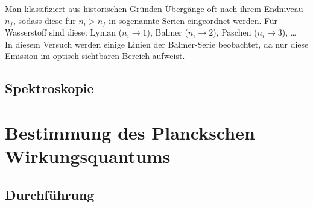 \documentclass[11pt, a4paper]{article}
\numberwithin{equation}{section}
\begin{document}
Man klassifiziert aus historischen Gründen Übergänge oft nach ihrem Endniveau $n_f$, sodass diese für $n_i > n_f$ in sogenannte Serien eingeordnet werden.
Für Wasserstoff sind diese: Lyman ($n_i \rightarrow 1$), Balmer ($n_i \rightarrow 2$), Paschen ($n_i \rightarrow 3$), \dots\\
In diesem Versuch werden einige Linien der Balmer-Serie beobachtet, da nur diese Emission im optisch sichtbaren Bereich aufweist.

\subsection{Spektroskopie}



\section{Bestimmung des Planckschen Wirkungsquantums}

\subsection{Durchführung}
\end{document}
